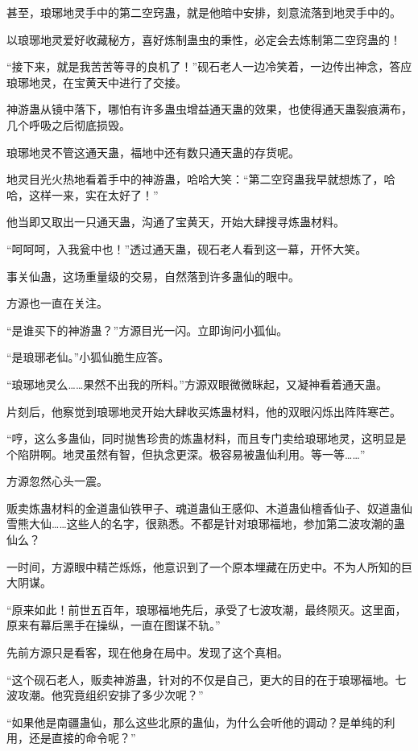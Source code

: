 \begin{this_body}
甚至，琅琊地灵手中的第二空窍蛊，就是他暗中安排，刻意流落到地灵手中的。

以琅琊地灵爱好收藏秘方，喜好炼制蛊虫的秉性，必定会去炼制第二空窍蛊的！

“接下来，就是我苦苦等寻的良机了！”砚石老人一边冷笑着，一边传出神念，答应琅琊地灵，在宝黄天中进行了交接。

神游蛊从镜中落下，哪怕有许多蛊虫增益通天蛊的效果，也使得通天蛊裂痕满布，几个呼吸之后彻底损毁。

琅琊地灵不管这通天蛊，福地中还有数只通天蛊的存货呢。

地灵目光火热地看着手中的神游蛊，哈哈大笑：“第二空窍蛊我早就想炼了，哈哈，这样一来，实在太好了！”

他当即又取出一只通天蛊，沟通了宝黄天，开始大肆搜寻炼蛊材料。

“呵呵呵，入我瓮中也！”透过通天蛊，砚石老人看到这一幕，开怀大笑。

事关仙蛊，这场重量级的交易，自然落到许多蛊仙的眼中。

方源也一直在关注。

“是谁买下的神游蛊？”方源目光一闪。立即询问小狐仙。

“是琅琊老仙。”小狐仙脆生应答。

“琅琊地灵么……果然不出我的所料。”方源双眼微微眯起，又凝神看着通天蛊。

片刻后，他察觉到琅琊地灵开始大肆收买炼蛊材料，他的双眼闪烁出阵阵寒芒。

“哼，这么多蛊仙，同时抛售珍贵的炼蛊材料，而且专门卖给琅琊地灵，这明显是个陷阱啊。地灵虽然有智，但执念更深。极容易被蛊仙利用。等一等……”

方源忽然心头一震。

贩卖炼蛊材料的金道蛊仙铁甲子、魂道蛊仙王感仰、木道蛊仙檀香仙子、奴道蛊仙雪熊大仙……这些人的名字，很熟悉。不都是针对琅琊福地，参加第二波攻潮的蛊仙么？

一时间，方源眼中精芒烁烁，他意识到了一个原本埋藏在历史中。不为人所知的巨大阴谋。

“原来如此！前世五百年，琅琊福地先后，承受了七波攻潮，最终陨灭。这里面，原来有幕后黑手在操纵，一直在图谋不轨。”

先前方源只是看客，现在他身在局中。发现了这个真相。

“这个砚石老人，贩卖神游蛊，针对的不仅是自己，更大的目的在于琅琊福地。七波攻潮。他究竟组织安排了多少次呢？”

“如果他是南疆蛊仙，那么这些北原的蛊仙，为什么会听他的调动？是单纯的利用，还是直接的命令呢？”


\end{this_body}
